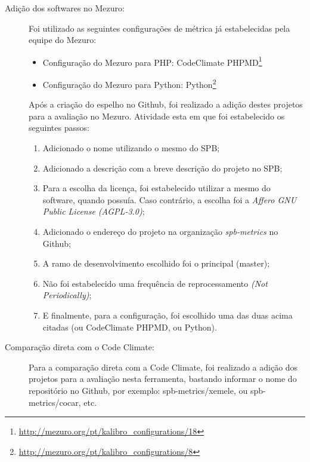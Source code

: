 \begin{description}
  \item [Adição dos softwares no Mezuro:]
    Foi utilizado as seguintes configurações de métrica já estabelecidas pela
    equipe do Mezuro:
    \begin{itemize}
        \item Configuração do Mezuro para PHP: CodeClimate
              PHPMD\footnote{\url{http://mezuro.org/pt/kalibro\_configurations/18}}
      \item Configuração do Mezuro para Python:
              Python\footnote{\url{http://mezuro.org/pt/kalibro\_configurations/8}}
    \end{itemize}

    Após a criação do espelho no Github, foi realizado a adição destes projetos
    para a avaliação no Mezuro. Atividade esta em que foi estabelecido os
    seguintes passos:
    \begin{enumerate}
        \item Adicionado o nome utilizando o mesmo do SPB;
        \item Adicionado a descrição com a breve descrição do projeto no SPB;
        \item Para a escolha da licença, foi estabelecido utilizar a mesmo do
              software, quando possuía. Caso contrário, a escolha foi a
              \textit{Affero GNU Public License (AGPL-3.0)};
        \item Adicionado o endereço do projeto na organização
              \textit{spb-metrics} no Github;
        \item A ramo de desenvolvimento escolhido foi o principal (master);
        \item Não foi estabelecido uma frequência de reprocessamento
              \textit{(Not Periodically)};
        \item E finalmente, para a configuração, foi escolhido uma das duas
              acima citadas (ou CodeClimate PHPMD, ou Python).
\end{enumerate}

  \item [Comparação direta com o Code Climate:]
    Para a comparação direta com a Code Climate, foi realizado a adição dos
    projetos para a avaliação nesta ferramenta, bastando informar o nome do
    repositório no Github, por exemplo: spb-metrics/xemele, ou
    spb-metrics/cocar, etc.


\end{description}

